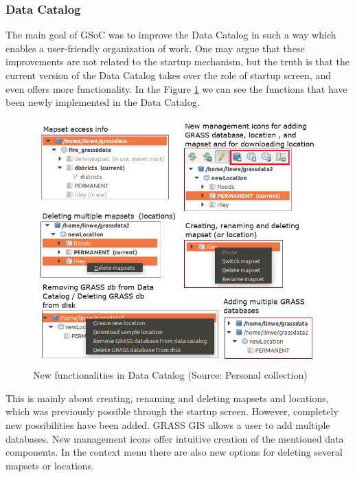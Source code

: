\documentclass[a4paper,10pt,twoside]{article}
\begin{document}
\newpage
\vspace*{-1cm}
\subsubsection{Data Catalog}

The main goal of GSoC was to improve the Data Catalog in such a way which enables a user-friendly organization of work. One may argue that these improvements are not related to the startup mechanism, but the truth is that the current version of the Data Catalog takes over the role of startup screen, and even offers more functionality. In the Figure \ref{fig:function} we can see the functions that have been newly implemented in the Data Catalog.

\vspace{0.3cm}
\begin{figure}[hbt!] 
\begin{center}
\includegraphics[width=15cm]{../pictures/funkce.png} 
\caption[New functionalities in Data Catalog ]{New functionalities in Data Catalog (Source: Personal collection)}
\label{fig:function}
\end{center}
\end{figure}

\noindent This is mainly about creating, renaming and deleting mapsets and locations, which was previously possible through the startup screen. However, completely new possibilities have been added. GRASS GIS allows a user to add multiple databases. New management icons offer intuitive creation of the mentioned data components. In the context menu there are also new options for deleting several mapsets or locations.
\end{document}
